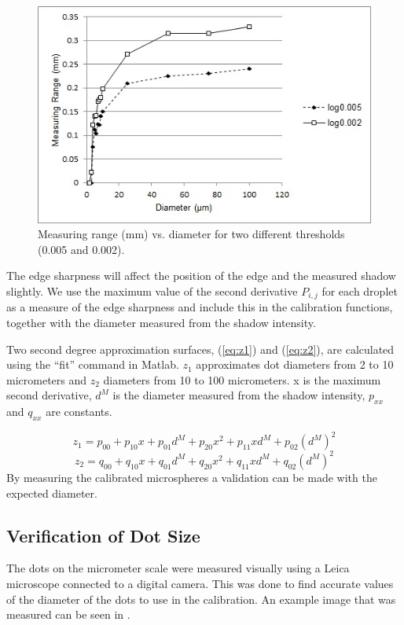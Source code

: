 \begin{figure}[ht]
\centering\includegraphics[width=0.75\linewidth]{figures/meas_range_vs_log_th}
\caption{Measuring range (mm) vs. diameter for two different thresholds (0.005 and 0.002).}
\label{fig:measrangevslogth}
\end{figure}

The edge sharpness will affect the position of the edge and the measured shadow slightly. We use the maximum value of the second derivative $P_{i,j}$ for each droplet as a measure of the edge sharpness and include this in the calibration functions, together with the diameter measured from the shadow intensity.

Two second degree approximation surfaces, (\ref{eq:z1}) and (\ref{eq:z2}), are calculated using the “fit” command in Matlab. $z_1$ approximates dot diameters from 2 to 10 micrometers and $z_2$ diameters from 10 to 100 micrometers. x is the maximum second derivative, $d^M$ is the diameter measured from the shadow intensity, $p_{xx}$ and $q_{xx}$ are constants.

\begin{equation} \label{eq:z1}
z_1=p_{00}+p_{10} x+p_{01} d^M+p_{20} x^2+p_{11} xd^M+p_{02} {(d^M)}^2
\end{equation}
\begin{equation} \label{eq:z2}
z_2=q_{00}+q_{10} x+q_{01} d^M+q_{20} x^2+q_{11} xd^M+q_{02} {(d^M)}^2
\end{equation}
By measuring the calibrated microspheres a validation can be made with the expected diameter. 

\subsection{Verification of Dot Size}

The dots on the micrometer scale were measured visually using a Leica microscope connected to a digital camera. This was done to find accurate values of the diameter of the dots to use in the calibration. An example image that was measured can be seen in .

